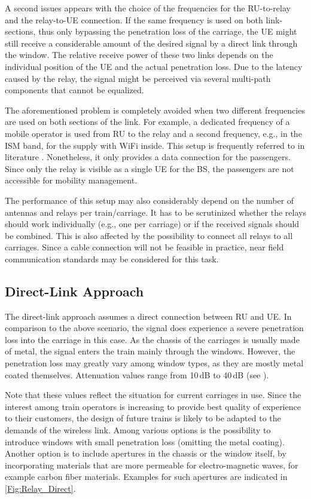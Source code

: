 \documentclass[a4paper,conference,twocolumn,10pt]{IEEEtran}
\begin{document}
A second issues appears with the choice of the frequencies for the \ac{RU}-to-relay and the relay-to-\ac{UE} connection. If the same frequency is used on both link-sections, thus only bypassing the penetration loss of the carriage, the \ac{UE} might still receive a considerable amount of the desired signal by a direct link through the window. The relative receive power of these two links depends on the individual position of the \ac{UE} and the actual penetration loss. Due to the latency caused by the relay, the signal might be perceived via several multi-path components that cannot be equalized.

The aforementioned problem is completely avoided when two different frequencies are used on both sections of the link. For example, a dedicated frequency of a mobile operator is used from \ac{RU} to the relay and a second frequency, e.g., in the ISM band, for the supply with WiFi inside. This setup is frequently referred to  in literature \cite{5872303}. Nonetheless, it only provides a data connection for the passengers. Since only the relay is visible as a single \ac{UE} for the \ac{BS}, the passengers are not accessible for mobility management. 

The performance of this setup may also considerably depend on the number of antennas and relays per train/carriage. It has to be scrutinized whether the relays should work individually (e.g., one per carriage) or if the received signals should be combined. This is also affected by the possibility to connect all relays to all carriages. Since a cable connection will not be feasible in practice, near field communication standards may be considered for this task.

\subsection{Direct-Link Approach}

The direct-link approach assumes a direct connection between \ac{RU} and \ac{UE}. In comparison to the above scenario, the signal does experience a severe penetration loss into the carriage in this case. As the chassis of the carriages is usually made of metal, the signal enters the train mainly through the windows. However, the penetration loss may greatly vary among window types, as they are mostly metal coated themselves.  Attenuation values range from 10\,dB to 40\,dB (see \cite{penetration_values}).

Note that these values reflect the situation for current carriages in use. Since the interest among train operators is  increasing to provide best quality of experience to their customers, the design of future trains is likely to be adapted to the demands of the wireless link. Among various options is the possibility to introduce windows with small penetration loss (omitting the metal coating). Another option is to include apertures in the chassis or the window itself, by incorporating materials that are more permeable for electro-magnetic waves, for example carbon fiber materials. Examples for such apertures are indicated in \cref{Fig:Relay_Direct}.
\end{document}
